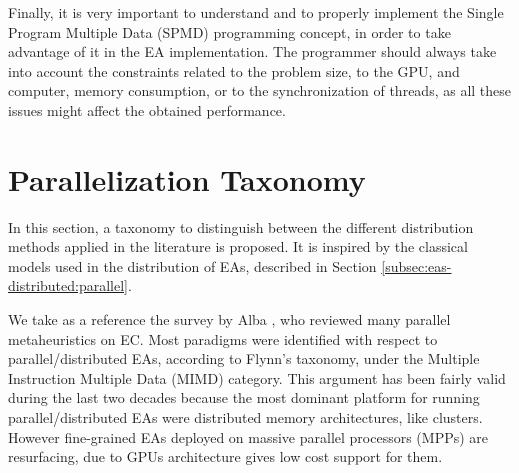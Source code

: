 \documentclass{article}
\begin{document}
Finally, it is very important to understand and to properly implement
the Single Program Multiple Data (SPMD)\cite{SPMD-wikipedia} programming
concept, in order to take advantage of it in the EA implementation. The programmer should always take into account the constraints related to the problem size, to the GPU, and computer, memory consumption, or to the synchronization of threads, as all these issues might affect the obtained performance.


\section{Parallelization Taxonomy}
\label{sec:taxonomy}

In this section, a taxonomy to distinguish between the different
distribution methods applied in the literature is proposed.
It is inspired by the classical models used in the distribution of EAs, described in Section \ref{subsec:eas-distributed:parallel}.

We take as a reference the survey by Alba \cite{Alba2005book}, who reviewed many parallel metaheuristics on EC. Most paradigms were identified with respect to
parallel/distributed EAs, according to Flynn's taxonomy, under the
Multiple Instruction Multiple Data (MIMD) category. This argument has
been fairly valid during the last two decades because the most
dominant platform for running parallel/distributed EAs were
distributed memory architectures, like clusters. However fine-grained
EAs deployed on massive parallel processors (MPPs) are resurfacing,
due to GPUs architecture gives low cost support for them.
\end{document}
